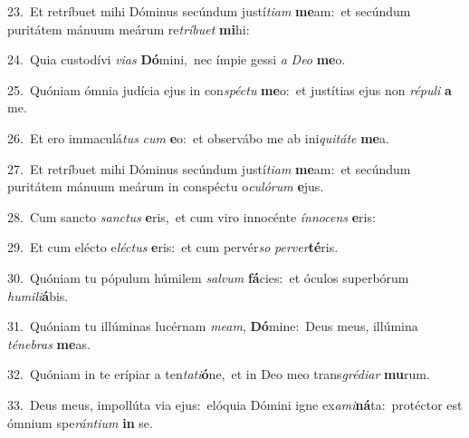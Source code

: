 {\numbfont\textcolor{\numbcolor}{23.}}~Et retríbuet mihi Dóminus secúndum justí\-\textit{ti}\-\textit{am} \textbf{me}\-am:~\star et secúndum puritátem mánuum meárum re\-\textit{trí}\-\textit{bu}\textit{et} \textbf{mi}\-hi:\par
{\numbfont\textcolor{\numbcolor}{24.}}~Quia custodívi \textit{vi}\-\textit{as} \textbf{Dó}\-mini,~\star nec ímpie gessi \textit{a} \textit{De}\-\textit{o} \textbf{me}\-o.\par
{\numbfont\textcolor{\numbcolor}{25.}}~Quóniam ómnia judícia ejus in con\-\textit{spéc}\-\textit{tu} \textbf{me}\-o:~\star et justítias ejus non \textit{ré}\-\textit{pu}\textit{li} \textbf{a} me.\par
{\numbfont\textcolor{\numbcolor}{26.}}~Et ero immaculá\textit{tus} \textit{cum} \textbf{e}\-o:~\star et observábo me ab ini\-\textit{qui}\-\textit{tá}\textit{te} \textbf{me}\-a.\par
{\numbfont\textcolor{\numbcolor}{27.}}~Et retríbuet mihi Dóminus secúndum justí\-\textit{ti}\-\textit{am} \textbf{me}\-am:~\star et secúndum puritátem mánuum meárum in conspéctu o\-\textit{cu}\-\textit{ló}\textit{rum} \textbf{e}\-jus.\par
{\numbfont\textcolor{\numbcolor}{28.}}~Cum sancto \textit{sanc}\-\textit{tus} \textbf{e}\-ris,~\star et cum viro innocénte \textit{ín}\-\textit{no}\textit{cens} \textbf{e}\-ris:\par
{\numbfont\textcolor{\numbcolor}{29.}}~Et cum elécto e\-\textit{léc}\-\textit{tus} \textbf{e}\-ris:~\star et cum pervér\textit{so} \textit{per}\-\textit{ver}\textbf{té}ris.\par
{\numbfont\textcolor{\numbcolor}{30.}}~Quóniam tu pópulum húmilem \textit{sal}\-\textit{vum} \textbf{fá}\-cies:~\star et óculos superbórum \textit{hu}\-\textit{mi}\textit{li}\textbf{á}bis.\par
{\numbfont\textcolor{\numbcolor}{31.}}~Quóniam tu illúminas lucérnam \textit{me}\-\textit{am}, \textbf{Dó}\-mine:~\star Deus meus, illúmina \textit{té}\-\textit{ne}\textit{bras} \textbf{me}\-as.\par
{\numbfont\textcolor{\numbcolor}{32.}}~Quóniam in te erípiar a ten\-\textit{ta}\-\textit{ti}\textbf{ó}ne,~\star et in Deo meo trans\-\textit{gré}\-\textit{di}\textit{ar} \textbf{mu}\-rum.\par
{\numbfont\textcolor{\numbcolor}{33.}}~Deus meus, impollúta via ejus:~\dagger elóquia Dómini igne ex\-\textit{a}\-\textit{mi}\textbf{ná}ta:~\star protéctor est ómnium spe\-\textit{rán}\-\textit{ti}\textit{um} \textbf{in} se.\par
